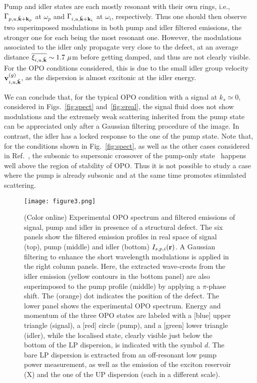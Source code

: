 Pump and idler states are each mostly resonant with their own
rings, i.e., $\Gamma_{p,u, \tilde{{\mathbf k}}+{\mathbf k}_p}$ at $\omega_p$
and $\Gamma_{i,u, \tilde{{\mathbf k}}+{\mathbf k}_i}$ at $\omega_i$,
respectively. Thus one should then observe two superimposed
modulations in both pump and idler filtered emissions, the stronger
one for each being the most resonant one.
%
However, the modulations associated to the idler only propagate very
close to the defect, at an average distance
$\overline{\xi_{i,u,\tilde{{\mathbf k}}}} \sim 1.7~\mu$m before getting
damped, and thus are not clearly visible. For the OPO conditions
considered, this is due to the small idler group velocity
${\mathbf v}_{i,u,\tilde{{\mathbf k}}}^{(g)}$, as the dispersion is almost
excitonic at the idler energy.

We can conclude that, for the typical OPO condition with a signal at
$k_s \simeq 0$, considered in Figs.~\ref{fig:spect}
and~\ref{fig:ereal}, the signal fluid does not show modulations and
the extremely weak scattering inherited from the pump state can be
appreciated only after a Gaussian filtering procedure of the image. In
contrast, the idler has a locked response to the one of the pump
state.
%
Note that, for the conditions shown in Fig.~\ref{fig:spect}, as well
as the other cases considered in Ref.~\cite{SM}, the subsonic to
supersonic crossover of the pump-only state~\cite{Amo_2009} happens
well above the region of stability of OPO. Thus it is not possible to
study a case where the pump is already subsonic and at the same time
promotes stimulated scattering.

%
\begin{figure}[h!]
\centering \texttt{[image: figure3.png]}
\caption{(Color online) Experimental OPO spectrum and filtered
  emissions of signal, pump and idler in presence of a structural
  defect. The six panels show the filtered emission profiles in real
  space of signal (top), pump (middle) and idler (bottom) $I_{s,
    p,i}({\mathbf r})$. A Gaussian filtering to enhance the short
  wavelength modulations is applied in the right column panels. Here,
  the extracted wave-crests from the idler emission (yellow contours
  in the bottom panel) are also superimposed to the pump profile
  (middle) by applying a $\pi$-phase shift. The (orange) dot indicates
  the position of the defect. The lower panel shows the experimental
  OPO spectrum. Energy and momentum of the three OPO states are
  labeled with a [blue] upper triangle (signal), a [red] circle
  (pump), and a [green] lower triangle (idler), while the localised
  state, clearly visible just below the bottom of the LP dispersion,
  is indicated with the symbol $d$. The bare LP dispersion is
  extracted from an off-resonant low pump power measurement, as well
  as the emission of the exciton reservoir (X) and the one of the UP
  dispersion (each in a different scale).}
\label{fig:exper}
\end{figure}
%
